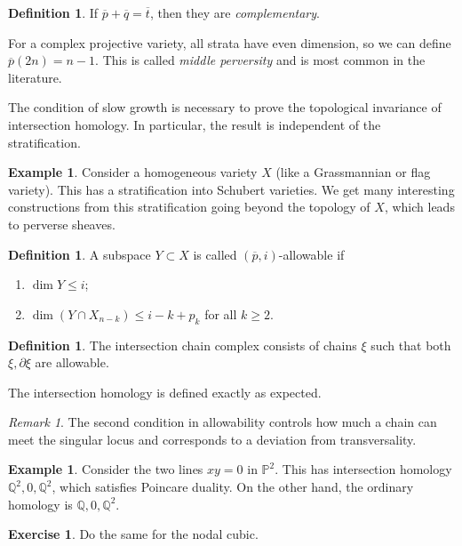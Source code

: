 \documentclass[leqno, openany]{memoir}
\theoremstyle{definition}
\newtheorem{defn}[thm]{Definition}
\newtheorem{exm}[thm]{Example}
\newtheorem{exer}[thm]{Exercise}
\theoremstyle{remark}
\newtheorem{rmk}[thm]{Remark}
\theoremstyle{plain}
\theoremstyle{definition}
\theoremstyle{remark}
\newcommand{\Q}{\mathbb{Q}}
\renewcommand{\P}{\mathbb{P}}
\begin{document}
\begin{defn} If $\overline{p} + \overline{q} = \overline{t}$, then they are
\textit{complementary}.  \end{defn}

For a complex projective variety, all strata have even dimension, so we can
define $\overline{p}(2n) = n-1$. This is called \textit{middle perversity} and
is most common in the literature.

The condition of slow growth is necessary to prove the topological invariance
of intersection homology. In particular, the result is independent of the
stratification.

\begin{exm} Consider a homogeneous variety $X$ (like a Grassmannian or flag
    variety). This has a stratification into Schubert varieties. We get many
    interesting constructions from this stratification going beyond the
    topology of $X$, which leads to perverse sheaves.  \end{exm}

\begin{defn} A subspace $Y \subset X$ is called $(\overline{p}, i)$-allowable
if \begin{enumerate} \item $\dim Y \leq i$; \item $\dim (Y \cap X_{n-k}) \leq i
- k + p_k$ for all $k \geq 2$.  \end{enumerate} \end{defn}

\begin{defn} The intersection chain complex consists of chains $\xi$ such that
both $\xi, \partial \xi$ are allowable.  \end{defn}

The intersection homology is defined exactly as expected.

\begin{rmk} The second condition in allowability controls how much a chain can
meet the singular locus and corresponds to a deviation from transversality.
\end{rmk}

\begin{exm} Consider the two lines $xy = 0$ in $\P^2$. This has intersection
homology $\Q^2, 0, \Q^2$, which satisfies Poincare duality. On the other hand,
the ordinary homology is $\Q, 0, \Q^2$.  \end{exm}

\begin{exer} Do the same for the nodal cubic.  \end{exer}
\end{document}
